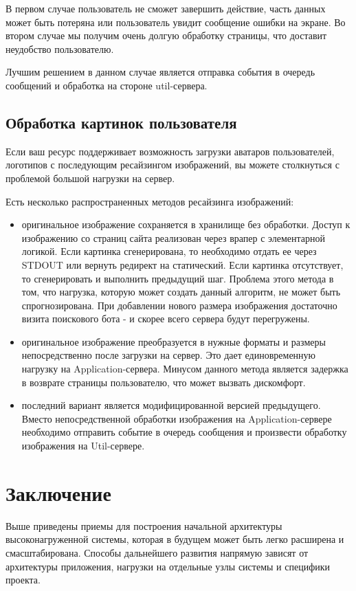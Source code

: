 \documentclass[10pt, a5paper]{article}
\begin{document}
В первом случае пользователь не сможет завершить действие, часть данных может быть потеряна или пользователь увидит сообщение ошибки на экране. 
Во втором случае мы получим очень долгую обработку страницы, что доставит неудобство пользователю. 

Лучшим решением в данном случае является отправка события в очередь сообщений и обработка на стороне util-сервера. 

\subsection*{Обработка картинок пользователя}
Если ваш ресурс поддерживает возможность загрузки аватаров пользователей, логотипов с последующим ресайзингом изображений, вы можете столкнуться с проблемой большой нагрузки на сервер. 

Есть несколько распространенных методов ресайзинга изображений:

\begin{itemize}
\item оригинальное изображение сохраняется в хранилище без обработки. Доступ к изображению со страниц сайта реализован через врапер с элементарной логикой. Если картинка сгенерирована, то необходимо отдать ее через STDOUT или вернуть редирект на статический. Если картинка отсутствует, то сгенерировать и выполнить предыдущий шаг. Проблема этого метода в том, что нагрузка, которую может создать данный алгоритм, не может быть спрогнозирована.  При добавлении нового размера изображения достаточно визита поискового бота - и скорее всего сервера будут перегружены. 
\item оригинальное изображение преобразуется в нужные форматы и размеры непосредственно после загрузки на сервер. Это дает единовременную нагрузку на Application-сервера. Минусом данного метода является задержка в возврате страницы пользователю, что может вызвать дискомфорт.
\item последний вариант является модифицированной версией предыдущего. Вместо непосредственной обработки изображения на Application-сервере необходимо отправить событие в очередь сообщения и произвести обработку изображения на Util-сервере. 
\end{itemize}

\section*{Заключение}

Выше приведены приемы для построения начальной архитектуры высоконагруженной системы, которая в будущем может быть легко расширена и  смасштабирована. Способы дальнейшего развития напрямую зависят от архитектуры приложения, нагрузки на отдельные узлы системы и специфики проекта.
\end{document}
